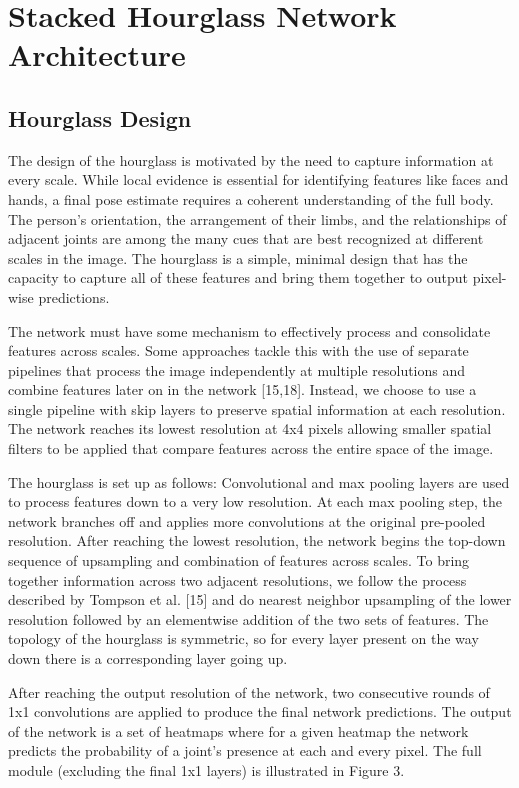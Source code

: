 
\thesistranslationoriginal
\section{Stacked Hourglass Network Architecture}

\subsection{Hourglass Design}

The design of the hourglass is motivated by the need to capture information at every scale. While local evidence is essential for identifying features like faces and hands, a final pose estimate requires a coherent understanding of the full body. The person’s orientation, the arrangement of their limbs, and the relationships of adjacent joints are among the many cues that are best recognized at different scales in the image. The hourglass is a simple, minimal design that has the capacity to capture all of these features and bring them together to output pixel-wise predictions.

The network must have some mechanism to effectively process and consolidate features across scales. Some approaches tackle this with the use of separate pipelines that process the image independently at multiple resolutions and combine features later on in the network [15,18]. Instead, we choose to use a single pipeline with skip layers to preserve spatial information at each resolution. The network reaches its lowest resolution at 4x4 pixels allowing smaller spatial filters to be applied that compare features across the entire space of the image.

The hourglass is set up as follows: Convolutional and max pooling layers are used to process features down to a very low resolution. At each max pooling step, the network branches off and applies more convolutions at the original pre-pooled resolution. After reaching the lowest resolution, the network begins the top-down sequence of upsampling and combination of features across scales. To bring together information across two adjacent resolutions, we follow the process described by Tompson et al. [15] and do nearest neighbor upsampling of the lower resolution followed by an elementwise addition of the two sets of features. The topology of the hourglass is symmetric, so for every layer present on the way down there is a corresponding layer going up.

After reaching the output resolution of the network, two consecutive rounds of 1x1 convolutions are applied to produce the final network predictions. The output of the network is a set of heatmaps where for a given heatmap the network predicts the probability of a joint’s presence at each and every pixel. The full module (excluding the final 1x1 layers) is illustrated in Figure 3.

